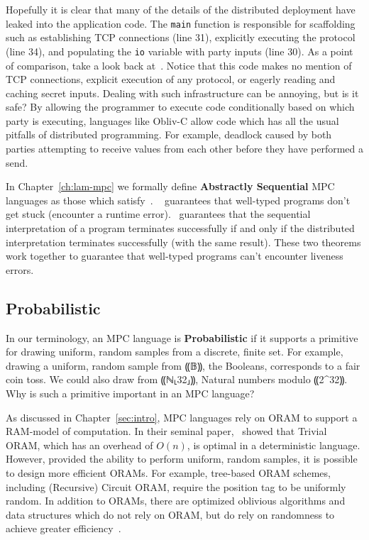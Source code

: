 Hopefully it is clear that many of the details of the distributed deployment have leaked into the application code.
The \lstinline[language=c,basicstyle=\ttfamily]{main} function is responsible for scaffolding such as establishing TCP connections (line 31),
explicitly executing the protocol (line 34), and populating the \lstinline[language=c,basicstyle=\ttfamily]{io} variable with party inputs (line 30). As
a point of comparison, take a look back at~. Notice that this code makes no mention of TCP connections,
explicit execution of any protocol, or eagerly reading and caching secret inputs. Dealing with such infrastructure can be annoying, but
is it safe? By allowing the programmer to execute code conditionally based on which party is executing, languages like Obliv-C allow code
which has all the usual pitfalls of distributed programming. For example, deadlock caused by both parties attempting to receive values
from each other before they have performed a send.

In Chapter~\ref{ch:lam-mpc} we formally define \textbf{Abstractly Sequential} MPC languages as those which satisfy~.
~ guarantees that well-typed \mpc programs don't get stuck (encounter a runtime error).~ guarantees
that the sequential interpretation of a program terminates successfully if and only if the distributed interpretation terminates successfully (with the same
result). These two theorems work together to guarantee that well-typed programs can't encounter liveness errors.

\subsection{Probabilistic}
\label{subsec:background-properties-probabilistic}

In our terminology, an MPC language is \textbf{Probabilistic} if it supports a primitive for drawing uniform, random samples from a
discrete, finite set. For example, drawing a uniform, random sample from ⸨𝔹⸩, the Booleans, corresponds to a fair coin toss. We
could also draw from ⸨ℕ⸤32⸥⸩, Natural numbers modulo ⸨2^{32}⸩. Why is such a primitive important in an MPC language?

As discussed in Chapter~\ref{sec:intro}, MPC languages rely on ORAM to support a RAM-model of computation. In their seminal paper,~\citet{}
showed that Trivial ORAM, which has an overhead of $O(n)$, is optimal in a deterministic language. However, provided the ability
to perform uniform, random samples, it is possible to design more efficient ORAMs. For example, tree-based ORAM schemes, including
(Recursive) Circuit ORAM, require the position tag to be uniformly random. In addition to ORAMs, there are optimized oblivious algorithms
and data structures which do not rely on ORAM, but do rely on randomness to achieve greater efficiency~\cite{}.

